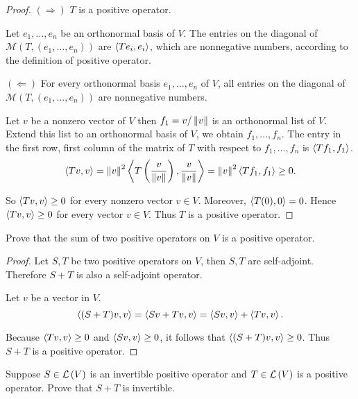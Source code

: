 \begin{proof}
    $(\Rightarrow)$ $T$ is a positive operator.

    Let $e_{1}, \ldots, e_{n}$ be an orthonormal basis of $V$. The entries on the diagonal of $\mathcal{M}(T, (e_{1}, \ldots, e_{n}))$ are $\left\langle{Te_{i}, e_{i}}\right\rangle$, which are nonnegative numbers, according to the definition of positive operator.

    \bigskip
    $(\Leftarrow)$ For every orthonormal basis $e_{1}, \ldots, e_{n}$ of $V$, all entries on the diagonal of $\mathcal{M}(T, (e_{1}, \ldots, e_{n}))$ are nonnegative numbers.

    Let $v$ be a nonzero vector of $V$ then $f_{1} = v/\left\Vert{v}\right\Vert$ is an orthonormal list of $V$. Extend this list to an orthonormal basis of $V$, we obtain $f_{1}, \ldots, f_{n}$. The entry in the first row, first column of the matrix of $T$ with respect to $f_{1}, \ldots, f_{n}$ is $\left\langle{Tf_{1}, f_{1}}\right\rangle$.
    \[
        \left\langle{Tv, v}\right\rangle = \left\Vert{v}\right\Vert^{2}\left\langle{T\left(\frac{v}{\left\Vert{v}\right\Vert}\right), \frac{v}{\left\Vert{v}\right\Vert}}\right\rangle = \left\Vert{v}\right\Vert^{2}\left\langle{Tf_{1}, f_{1}}\right\rangle\geq 0.
    \]

    So $\left\langle{Tv, v}\right\rangle\geq 0$ for every nonzero vector $v\in V$. Moreover, $\left\langle{T(0), 0}\right\rangle = 0$. Hence $\left\langle{Tv, v}\right\rangle\geq 0$ for every vector $v\in V$. Thus $T$ is a positive operator.
\end{proof}
\newpage

\begin{exercise}\label{chapter7:sectionC:exercise6}
    Prove that the sum of two positive operators on $V$ is a positive operator.
\end{exercise}

\begin{proof}
    Let $S, T$ be two positive operators on $V$, then $S, T$ are self-adjoint. Therefore $S + T$ is also a self-adjoint operator.

    Let $v$ be a vector in $V$.
    \[
        \left\langle{(S + T)v, v}\right\rangle = \left\langle{Sv + Tv, v}\right\rangle = \left\langle{Sv, v}\right\rangle + \left\langle{Tv, v}\right\rangle.
    \]

    Because $\left\langle{Tv, v}\right\rangle\geq 0$ and $\left\langle{Sv, v}\right\rangle\geq 0$, it follows that $\left\langle{(S + T)v, v}\right\rangle\geq 0$. Thus $S + T$ is a positive operator.
\end{proof}
\newpage

\begin{exercise}
    Suppose $S \in \mathcal{L}\left({V}\right)$ is an invertible positive operator and $T\in\mathcal{L}\left({V}\right)$ is a positive operator. Prove that $S + T$ is invertible.
\end{exercise}

